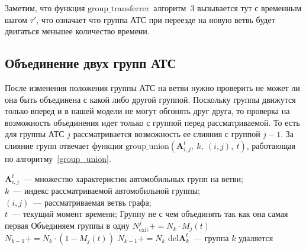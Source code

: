 Заметим, что функция $\text{group\_transferrer}$~алгоритм~3 вызывается тут с временным шагом $\tau'$, что означает что группа АТС при переезде на новую ветвь будет двигаться меньшее количество времени.


\subsection{Объединение двух групп АТС}
    После изменения положения группы АТС на ветви нужно проверить не может ли она быть объединена с какой либо другой группой.
    Поскольку группы движутся только вперед и в нашей модели не могут обгонять друг друга, то проверка на возможность
    объединения идет только с группой перед рассматриваемой.
    То есть для группы АТС $j$ рассматривается возможность ее слияния с группой $j-1$.
    За слияние групп отвечает функция $\text{group\_union}(\mathbf{A}^t_{i,j},\ k,\ (i,j),\ t)$, работающая по алгоритму~\ref{group_union}.

    \begin{algorithmic}
        \REQUIRE $\mathbf{A}^t_{i,j}$~--- множество характеристик автомобильных групп на ветви; \\
                 $k$~--- индекс рассматриваемой автомобильной группы; \\
                 $(i,j)$~--- рассматриваемая ветвь графа; \\
                 $t$~--- текущий момент времени;
            \STATE Группу не с чем объединять так как она самая первая
        \ELSE
                \STATE Объединяем группы в одну
                    \STATE $N^{j}_\text{exit} += N_k \cdot M_j(t)$
                    \STATE $N_{k-1} += N_k \cdot (1 - M_j(t))$
                \ELSE
                    \STATE $N_{k-1} += N_k$
                \ENDIF
                \STATE $\text{del} \mathbf{A}^t_k$~--- группа $k$ удаляется
            \ENDIF
        \ENDIF
    \end{algorithmic}



